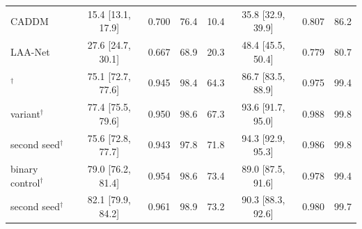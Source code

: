 \begin{tabular}{@{}l cccc ccc@{}}
CADDM~\cite{caddm} & 15.4 [13.1, 17.9] & 0.700 & 76.4 & 10.4 & 35.8 [32.9, 39.9] & 0.807 & 86.2 \\
LAA-Net~\cite{laanet} & 27.6 [24.7, 30.1] & 0.667 & 68.9 & 20.3 & 48.4 [45.5, 50.4] & 0.779 & 80.7 \\
\midrule
\ours{}$^\dagger$ & 75.1 [72.7, 77.6] & 0.945 & 98.4 & 64.3 & 86.7 [83.5, 88.9] & 0.975 & 99.4 \\
\ours{} variant$^\dagger$ & 77.4 [75.5, 79.6] & 0.950 & 98.6 & 67.3 & 93.6 [91.7, 95.0] & 0.988 & 99.8 \\
\quad second seed$^\dagger$ & 75.6 [72.8, 77.7] & 0.943 & 97.8 & 71.8 & 94.3 [92.9, 95.3] & 0.986 & 99.8 \\
binary control$^\dagger$ & 79.0 [76.2, 81.4] & 0.954 & 98.6 & 73.4 & 89.0 [87.5, 91.6] & 0.978 & 99.4 \\
\quad second seed$^\dagger$ & 82.1 [79.9, 84.2] & 0.961 & 98.9 & 73.2 & 90.3 [88.3, 92.6] & 0.980 & 99.7 \\
\bottomrule
\end{tabular}
